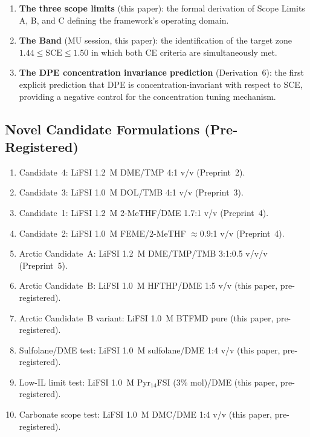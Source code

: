 \documentclass[11pt]{article}
\theoremstyle{plain}
\theoremstyle{definition}
\theoremstyle{remark}
\begin{document}
\begin{enumerate}[leftmargin=2em]
        ether-class molecule to a region (reached, unreachable,
        discarded) relative to $\mathrm{SCE}^{*}$.
  \item \textbf{The three scope limits} (this paper): the
        formal derivation of Scope Limits A, B, and C defining
        the framework's operating domain.
  \item \textbf{The Band} (MU session, this paper): the
        identification of the target zone $1.44 \leq \mathrm{SCE}
        \leq 1.50$ in which both CE criteria are simultaneously met.
  \item \textbf{The DPE concentration invariance prediction}
        (Derivation~6): the first explicit prediction that DPE
        is concentration-invariant with respect to SCE, providing
        a negative control for the concentration tuning mechanism.
\end{enumerate}

\subsection{Novel Candidate Formulations (Pre-Registered)}

\begin{enumerate}[leftmargin=2em]
  \item Candidate~4: LiFSI 1.2~M DME/TMP 4:1 v/v (Preprint~2).
  \item Candidate~3: LiFSI 1.0~M DOL/TMB 4:1 v/v (Preprint~3).
  \item Candidate~1: LiFSI 1.2~M 2-MeTHF/DME 1.7:1 v/v (Preprint~4).
  \item Candidate~2: LiFSI 1.0~M FEME/2-MeTHF $\approx$0.9:1 v/v
        (Preprint~4).
  \item Arctic Candidate~A: LiFSI 1.2~M DME/TMP/TMB 3:1:0.5
        v/v/v (Preprint~5).
  \item Arctic Candidate~B: LiFSI 1.0~M HFTHP/DME 1:5 v/v
        (this paper, pre-registered).
  \item Arctic Candidate~B variant: LiFSI 1.0~M BTFMD pure
        (this paper, pre-registered).
  \item Sulfolane/DME test: LiFSI 1.0~M sulfolane/DME 1:4 v/v
        (this paper, pre-registered).
  \item Low-IL limit test: LiFSI 1.0~M Pyr$_{14}$FSI (3\% mol)/DME
        (this paper, pre-registered).
  \item Carbonate scope test: LiFSI 1.0~M DMC/DME 1:4 v/v
        (this paper, pre-registered).
\end{enumerate}
\end{document}
